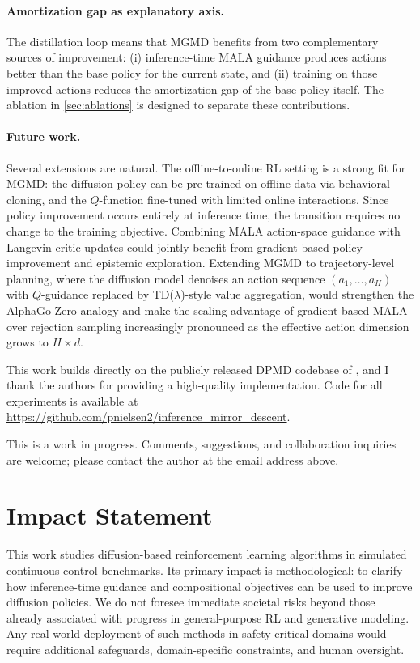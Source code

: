 \documentclass{article}
\theoremstyle{plain}
\theoremstyle{definition}
\theoremstyle{remark}
\begin{document}
\paragraph{Amortization gap as explanatory axis.}
The distillation loop means that MGMD benefits from two complementary sources of improvement: (i) inference-time MALA guidance produces actions better than the base policy for the current state, and (ii) training on those improved actions reduces the amortization gap of the base policy itself.
The ablation in \cref{sec:ablations} is designed to separate these contributions.

\paragraph{Future work.}
Several extensions are natural.
The offline-to-online RL setting is a strong fit for MGMD: the diffusion policy can be pre-trained on offline data via behavioral cloning, and the $Q$-function fine-tuned with limited online interactions.
Since policy improvement occurs entirely at inference time, the transition requires no change to the training objective.
Combining MALA action-space guidance with Langevin critic updates \citep{lsac2025} could jointly benefit from gradient-based policy improvement and epistemic exploration.
Extending MGMD to trajectory-level planning, where the diffusion model denoises an action sequence $(a_1, \ldots, a_H)$ with $Q$-guidance replaced by TD($\lambda$)-style value aggregation, would strengthen the AlphaGo Zero analogy and make the scaling advantage of gradient-based MALA over rejection sampling increasingly pronounced as the effective action dimension grows to $H \times d$.

\begin{ack}
This work builds directly on the publicly released DPMD codebase of \citet{ma2025soft}, and I thank the authors for providing a high-quality implementation.
Code for all experiments is available at \url{https://github.com/pnielsen2/inference_mirror_descent}.

This is a work in progress.
Comments, suggestions, and collaboration inquiries are welcome; please contact the author at the email address above.
\end{ack}

\section*{Impact Statement}

This work studies diffusion-based reinforcement learning algorithms in simulated continuous-control benchmarks.
Its primary impact is methodological: to clarify how inference-time guidance and compositional objectives can be used to improve diffusion policies.
We do not foresee immediate societal risks beyond those already associated with progress in general-purpose RL and generative modeling.
Any real-world deployment of such methods in safety-critical domains would require additional safeguards, domain-specific constraints, and human oversight.
\end{document}
